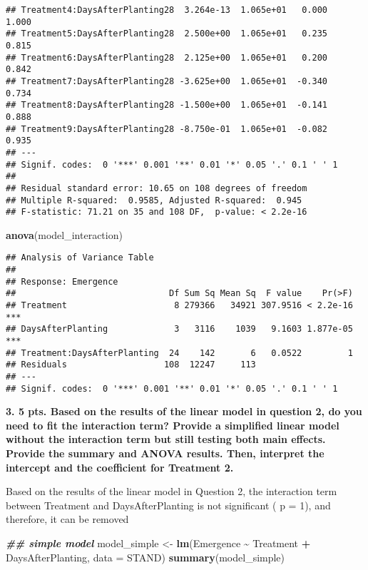 \documentclass[
]{article}
\newenvironment{Shaded}{\begin{snugshade}}{\end{snugshade}}
\newcommand{\AttributeTok}[1]{\textcolor[rgb]{0.13,0.29,0.53}{#1}}
\newcommand{\DocumentationTok}[1]{\textcolor[rgb]{0.56,0.35,0.01}{\textbf{\textit{#1}}}}
\newcommand{\FunctionTok}[1]{\textcolor[rgb]{0.13,0.29,0.53}{\textbf{#1}}}
\newcommand{\NormalTok}[1]{#1}
\newcommand{\OtherTok}[1]{\textcolor[rgb]{0.56,0.35,0.01}{#1}}
\newcommand{\SpecialCharTok}[1]{\textcolor[rgb]{0.81,0.36,0.00}{\textbf{#1}}}
\begin{document}
\begin{verbatim}
## Treatment4:DaysAfterPlanting28  3.264e-13  1.065e+01   0.000    1.000    
## Treatment5:DaysAfterPlanting28  2.500e+00  1.065e+01   0.235    0.815    
## Treatment6:DaysAfterPlanting28  2.125e+00  1.065e+01   0.200    0.842    
## Treatment7:DaysAfterPlanting28 -3.625e+00  1.065e+01  -0.340    0.734    
## Treatment8:DaysAfterPlanting28 -1.500e+00  1.065e+01  -0.141    0.888    
## Treatment9:DaysAfterPlanting28 -8.750e-01  1.065e+01  -0.082    0.935    
## ---
## Signif. codes:  0 '***' 0.001 '**' 0.01 '*' 0.05 '.' 0.1 ' ' 1
## 
## Residual standard error: 10.65 on 108 degrees of freedom
## Multiple R-squared:  0.9585, Adjusted R-squared:  0.945 
## F-statistic: 71.21 on 35 and 108 DF,  p-value: < 2.2e-16
\end{verbatim}

\begin{Shaded}
\begin{Highlighting}[]
\FunctionTok{anova}\NormalTok{(model\_interaction)}
\end{Highlighting}
\end{Shaded}

\begin{verbatim}
## Analysis of Variance Table
## 
## Response: Emergence
##                              Df Sum Sq Mean Sq  F value    Pr(>F)    
## Treatment                     8 279366   34921 307.9516 < 2.2e-16 ***
## DaysAfterPlanting             3   3116    1039   9.1603 1.877e-05 ***
## Treatment:DaysAfterPlanting  24    142       6   0.0522         1    
## Residuals                   108  12247     113                       
## ---
## Signif. codes:  0 '***' 0.001 '**' 0.01 '*' 0.05 '.' 0.1 ' ' 1
\end{verbatim}

\textbf{3. 5 pts. Based on the results of the linear model in question
2, do you need to fit the interaction term? Provide a simplified linear
model without the interaction term but still testing both main effects.
Provide the summary and ANOVA results. Then, interpret the intercept and
the coefficient for Treatment 2.}

Based on the results of the linear model in Question 2, the interaction
term between Treatment and DaysAfterPlanting is not significant ( p =
1), and therefore, it can be removed

\begin{Shaded}
\begin{Highlighting}[]
\DocumentationTok{\#\# simple model}
\NormalTok{model\_simple }\OtherTok{\textless{}{-}} \FunctionTok{lm}\NormalTok{(Emergence }\SpecialCharTok{\textasciitilde{}}\NormalTok{ Treatment }\SpecialCharTok{+}\NormalTok{ DaysAfterPlanting, }\AttributeTok{data =}\NormalTok{ STAND)}
\FunctionTok{summary}\NormalTok{(model\_simple)}
\end{Highlighting}
\end{Shaded}
\end{document}
